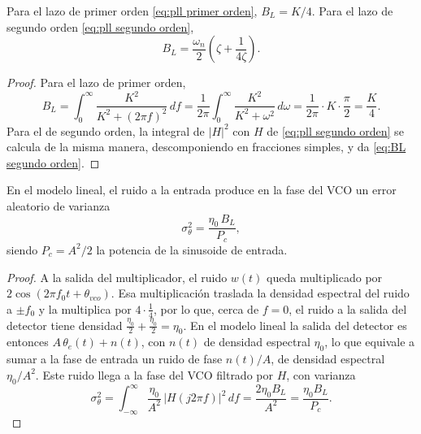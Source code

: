 \begin{proposicion}\label{prop:pll BL}
Para el lazo de primer orden \eqref{eq:pll primer orden}, $B_L=K/4$. Para el lazo de segundo orden \eqref{eq:pll segundo orden},
\begin{equation}\label{eq:BL segundo orden}
    B_L = \frac{\omega_n}{2}\left(\zeta+\frac{1}{4\zeta}\right).
\end{equation}
\end{proposicion}
\begin{proof}
Para el lazo de primer orden,
\begin{equation*}
    B_L = \int_0^\infty \frac{K^2}{K^2+(2\pi f)^2}\, df = \frac{1}{2\pi}\int_0^\infty\frac{K^2}{K^2+\omega^2}\,d\omega = \frac{1}{2\pi}\cdot K\cdot\frac{\pi}{2} = \frac{K}{4}.
\end{equation*}
Para el de segundo orden, la integral de $|H|^2$ con $H$ de \eqref{eq:pll segundo orden} se calcula de la misma manera, descomponiendo en fracciones simples, y da \eqref{eq:BL segundo orden}.
\end{proof}


\begin{proposicion}\label{prop:pll ruido}
En el modelo lineal, el ruido a la entrada produce en la fase del VCO un error aleatorio de varianza
\begin{equation}\label{eq:varianza fase}
    \sigma_\theta^2 = \frac{\eta_0\, B_L}{P_c},
\end{equation}
siendo $P_c=A^2/2$ la potencia de la sinusoide de entrada.
\end{proposicion}
\begin{proof}
A la salida del multiplicador, el ruido $w(t)$ queda multiplicado por $2\cos(2\pi f_0t+\theta_{vco})$. Esa multiplicación traslada la densidad espectral del ruido a $\pm f_0$ y la multiplica por $4\cdot\frac14$, por lo que, cerca de $f=0$, el ruido a la salida del detector tiene densidad $\frac{\eta_0}{2}+\frac{\eta_0}{2}=\eta_0$. En el modelo lineal la salida del detector es entonces $A\,\theta_e(t)+n(t)$, con $n(t)$ de densidad espectral $\eta_0$, lo que equivale a sumar a la fase de entrada un ruido de fase $n(t)/A$, de densidad espectral $\eta_0/A^2$. Este ruido llega a la fase del VCO filtrado por $H$, con varianza
\begin{equation*}
    \sigma_\theta^2 = \int_{-\infty}^{\infty} \frac{\eta_0}{A^2}\,|H(j2\pi f)|^2\, df = \frac{2\eta_0 B_L}{A^2} = \frac{\eta_0B_L}{P_c}.
\end{equation*}
\end{proof}

